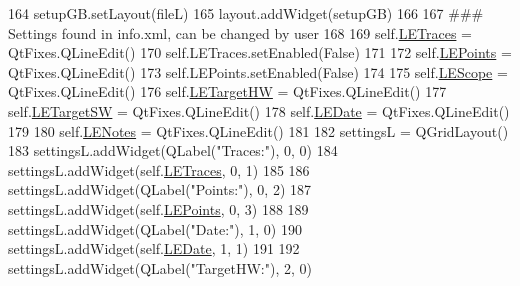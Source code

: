 \begin{DoxyCode}
164         setupGB.setLayout(fileL)
165         layout.addWidget(setupGB)
166 
167         \textcolor{comment}{### Settings found in info.xml, can be changed by user}
168 
169         self.\hyperlink{classsoftware_1_1chipwhisperer_1_1common_1_1traces_1_1TraceContainerDPAv3_1_1ImportDPAv3Dialog_a8b9b90e56569f5ce2e8090057c0c4a8a}{LETraces} = QtFixes.QLineEdit()
170         self.LETraces.setEnabled(\textcolor{keyword}{False})
171 
172         self.\hyperlink{classsoftware_1_1chipwhisperer_1_1common_1_1traces_1_1TraceContainerDPAv3_1_1ImportDPAv3Dialog_aca2ce0207bb217a9602c7071f052a59d}{LEPoints} = QtFixes.QLineEdit()
173         self.LEPoints.setEnabled(\textcolor{keyword}{False})
174 
175         self.\hyperlink{classsoftware_1_1chipwhisperer_1_1common_1_1traces_1_1TraceContainerDPAv3_1_1ImportDPAv3Dialog_aaed8b45895879c0ec9180544072352e8}{LEScope} = QtFixes.QLineEdit()
176         self.\hyperlink{classsoftware_1_1chipwhisperer_1_1common_1_1traces_1_1TraceContainerDPAv3_1_1ImportDPAv3Dialog_aa18f50cd04f9119d116c56753147d33b}{LETargetHW} = QtFixes.QLineEdit()
177         self.\hyperlink{classsoftware_1_1chipwhisperer_1_1common_1_1traces_1_1TraceContainerDPAv3_1_1ImportDPAv3Dialog_a07c0ca40a1e232c52bda9775c0cc02f6}{LETargetSW} = QtFixes.QLineEdit()
178         self.\hyperlink{classsoftware_1_1chipwhisperer_1_1common_1_1traces_1_1TraceContainerDPAv3_1_1ImportDPAv3Dialog_a1abdc14ed5207a0170526ad1df344c5a}{LEDate} = QtFixes.QLineEdit()
179 
180         self.\hyperlink{classsoftware_1_1chipwhisperer_1_1common_1_1traces_1_1TraceContainerDPAv3_1_1ImportDPAv3Dialog_a4150ecb693edb8a61987d6fca245a042}{LENotes} = QtFixes.QLineEdit()
181 
182         settingsL = QGridLayout()
183         settingsL.addWidget(QLabel(\textcolor{stringliteral}{"Traces:"}), 0, 0)
184         settingsL.addWidget(self.\hyperlink{classsoftware_1_1chipwhisperer_1_1common_1_1traces_1_1TraceContainerDPAv3_1_1ImportDPAv3Dialog_a8b9b90e56569f5ce2e8090057c0c4a8a}{LETraces}, 0, 1)
185 
186         settingsL.addWidget(QLabel(\textcolor{stringliteral}{"Points:"}), 0, 2)
187         settingsL.addWidget(self.\hyperlink{classsoftware_1_1chipwhisperer_1_1common_1_1traces_1_1TraceContainerDPAv3_1_1ImportDPAv3Dialog_aca2ce0207bb217a9602c7071f052a59d}{LEPoints}, 0, 3)
188 
189         settingsL.addWidget(QLabel(\textcolor{stringliteral}{"Date:"}), 1, 0)
190         settingsL.addWidget(self.\hyperlink{classsoftware_1_1chipwhisperer_1_1common_1_1traces_1_1TraceContainerDPAv3_1_1ImportDPAv3Dialog_a1abdc14ed5207a0170526ad1df344c5a}{LEDate}, 1, 1)
191 
192         settingsL.addWidget(QLabel(\textcolor{stringliteral}{"TargetHW:"}), 2, 0)

\end{DoxyCode}
